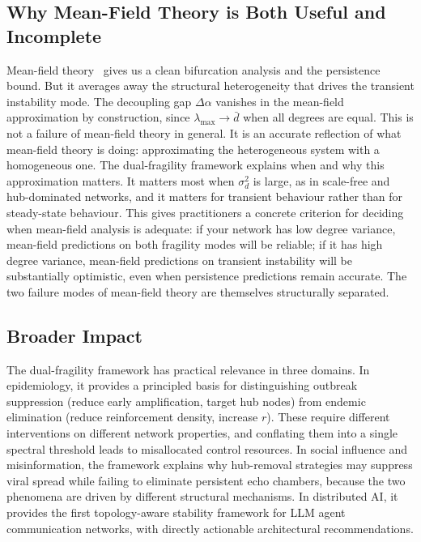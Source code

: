 \documentclass[10pt,twocolumn]{article}
\theoremstyle{myproof}
\newcommand{\lmax}{\lambda_{\max}}
\begin{document}
\subsection{Why Mean-Field Theory is Both Useful and Incomplete}
Mean-field theory~\cite{pastor2001,pastor2015} gives us a clean bifurcation analysis and the
persistence bound. But it averages away the structural heterogeneity that drives the transient
instability mode. The decoupling gap $\Delta\alpha$ vanishes in the mean-field approximation by
construction, since $\lmax\to\bar{d}$ when all degrees are equal. This is not a failure of
mean-field theory in general. It is an accurate reflection of what mean-field theory is doing:
approximating the heterogeneous system with a homogeneous one. The dual-fragility framework
explains when and why this approximation matters. It matters most when $\sigma^2_d$ is large,
as in scale-free and hub-dominated networks, and it matters for transient behaviour rather than
for steady-state behaviour. This gives practitioners a concrete criterion for deciding when
mean-field analysis is adequate: if your network has low degree variance, mean-field predictions
on both fragility modes will be reliable; if it has high degree variance, mean-field predictions
on transient instability will be substantially optimistic, even when persistence predictions remain
accurate. The two failure modes of mean-field theory are themselves structurally separated.

\subsection{Broader Impact}
The dual-fragility framework has practical relevance in three domains. In epidemiology, it
provides a principled basis for distinguishing outbreak suppression (reduce early amplification,
target hub nodes) from endemic elimination (reduce reinforcement density, increase $r$). These
require different interventions on different network properties, and conflating them into a single
spectral threshold leads to misallocated control resources. In social influence and misinformation,
the framework explains why hub-removal strategies may suppress viral spread while failing to
eliminate persistent echo chambers, because the two phenomena are driven by different structural
mechanisms. In distributed AI, it provides the first topology-aware stability framework for LLM
agent communication networks, with directly actionable architectural recommendations.
\end{document}
